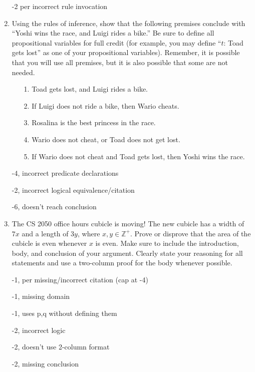 \begin{enumerate}
\begin{rubric}
-2 per incorrect rule invocation
\end{rubric}

\item Using the rules of inference, show that the following premises conclude with “Yoshi wins the race, and Luigi rides a bike.” Be sure to define all propositional variables for full credit (for example, you may define “$t$: Toad gets lost” as one of your propositional variables). Remember, it is possible that you will use all premises, but it is also possible that some are not needed. 

\begin{enumerate}
    \item[1.] Toad gets lost, and Luigi rides a bike.
    \item[2.] If Luigi does not ride a bike, then Wario cheats.
    \item[3.] Rosalina is the best princess in the race.
    \item[4.] Wario does not cheat, or Toad does not get lost.
    \item[5.] If Wario does not cheat and Toad gets lost, then Yoshi wins the race.
\end{enumerate}

\begin{rubric}
-4, incorrect predicate declarations

-2, incorrect logical equivalence/citation

-6, doesn't reach conclusion
\end{rubric}

\item The CS 2050 office hours cubicle is moving! The new cubicle has a width of $7x$ and a length of $3y$, where $x, y \in \mathbb{Z}^+$. Prove or disprove that the area of the cubicle is even whenever $x$ is even. Make sure to include the introduction, body, and conclusion of your argument. Clearly state your reasoning for all statements and use a two-column proof for the body whenever possible. 

\begin{rubric}
-1, per missing/incorrect citation (cap at -4)

-1, missing domain

-1, uses p,q without defining them

-2, incorrect logic

-2, doesn't use 2-column format

-2, missing conclusion


\end{rubric}
\end{enumerate}
